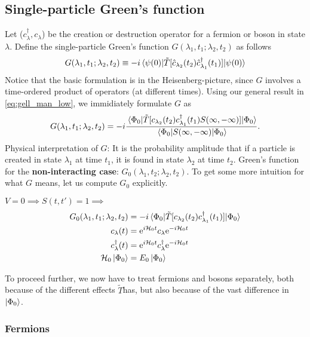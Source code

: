 \subsection{Single-particle Green's function}
Let ($c_\lambda^\dagger, c_\lambda$) be the creation or destruction operator for a fermion or boson in state $\lambda$. Define the single-particle Green's function $G(\lambda_1, t_1;\lambda_2, t_2)$ as follows
\begin{equation} 
\label{eq:greens_definition}
G(\lambda_1, t_1;\lambda_2, t_2) \equiv -i\ev{\tilde{T}[\hat{c}_{\lambda_2}(t_2)\hat{c}_{\lambda_1}^\dagger(t_1)]}{\psi(0)}
\end{equation}
Notice that the basic formulation is in the Heisenberg-picture, since $G$ involves a time-ordered product of operators (at different times). Using our general result in \cref{eq:gell_man_low}, we immidiately formulate $G$ as
\begin{equation} 
G(\lambda_1, t_1;\lambda_2, t_2) = -i\frac{\ev{\tilde{T}[{c}_{\lambda_2}(t_2){c}_{\lambda_1}^\dagger(t_1)S(\infty, -\infty)]}{\Phi_0}}{\ev{S(\infty, -\infty)}{\Phi_0}}.
\end{equation}
Physical interpretation of $G$: It is the probability amplitude that if a particle is created in state $\lambda_1$ at time $t_1$, it is found in state $\lambda_2$ at time $t_2$. Green's function for the \textbf{non-interacting case}: $G_0(\lambda_1, t_2;\lambda_2, t_2)$. To get some more intuition for what $G$ means, let us compute $G_0$ explicitly. 

$V =0 \implies S(t, t') = 1 \implies$
\begin{align} 
\label{eq:non_int_greens_fermion}
G_0(\lambda_1, t_1; \lambda_2, t_2) &= -i\ev{\tilde{T}[c_{\lambda_2}(t_2)c_{\lambda_1}^\dagger(t_1)]}{\Phi_0}
\\
c_\lambda(t) &= \e^{i\Ha_0t}c_\lambda\e^{-i\Ha_0t} \\
c_\lambda^\dagger(t) &=
\e^{i\Ha_0t}c_\lambda^\dagger\e^{-i\Ha_0t} \\
\Ha_0\ket{\Phi_0} &= E_0\ket{\Phi_0}
\end{align}

To proceed further, we now have to treat fermions and bosons separately, both because of the different effects  $\tilde{T}$has, but also because of the vast difference in $\ket{\Phi_0}$.

\subsubsection{Fermions}

